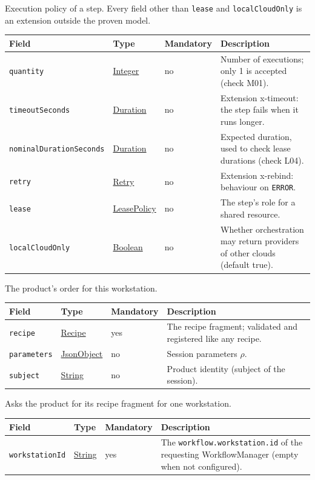 \documentclass[a4paper]{arrowhead}
\newcommand{\mref}[1]{{\textcolor{ArrowheadPurple}{\hyperref[sec:model:#1]{#1}}}}
\newcommand{\pref}[1]{{\textcolor{ArrowheadGrey}{\hyperref[sec:model:primitives:#1]{#1}}}}
\begin{document}
Execution policy of a step. Every field other than \texttt{lease} and \texttt{localCloudOnly} is an extension outside the proven model.

{\small
\begin{longtable}{|p{3.7cm}|p{4.2cm}|p{1.6cm}|p{6.3cm}|}

\hline
\rowcolor{gray!33} Field & Type & Mandatory & Description \\ \hline
\endhead
\texttt{quantity} & \pref{Integer} & no & Number of executions; only 1 is accepted (check M01). \\ \hline
\texttt{timeoutSeconds} & \pref{Duration} & no & Extension x-timeout: the step fails when it runs longer. \\ \hline
\texttt{nominalDurationSeconds} & \pref{Duration} & no & Expected duration, used to check lease durations (check L04). \\ \hline
\texttt{retry} & \mref{Retry} & no & Extension x-rebind: behaviour on \texttt{ERROR}. \\ \hline
\texttt{lease} & \mref{LeasePolicy} & no & The step's role for a shared resource. \\ \hline
\texttt{localCloudOnly} & \pref{Boolean} & no & Whether orchestration may return providers of other clouds (default true). \\ \hline
\end{longtable}
}

The product's order for this workstation.

{\small
\begin{longtable}{|p{3.7cm}|p{4.2cm}|p{1.6cm}|p{6.3cm}|}

\hline
\rowcolor{gray!33} Field & Type & Mandatory & Description \\ \hline
\endhead
\texttt{recipe} & \mref{Recipe} & yes & The recipe fragment; validated and registered like any recipe. \\ \hline
\texttt{parameters} & \pref{JsonObject} & no & Session parameters $\rho$. \\ \hline
\texttt{subject} & \pref{String} & no & Product identity (subject of the session). \\ \hline
\end{longtable}
}

Asks the product for its recipe fragment for one workstation.

{\small
\begin{longtable}{|p{3.7cm}|p{4.2cm}|p{1.6cm}|p{6.3cm}|}

\hline
\rowcolor{gray!33} Field & Type & Mandatory & Description \\ \hline
\endhead
\texttt{workstationId} & \pref{String} & yes & The \texttt{workflow.workstation.id} of the requesting WorkflowManager (empty when not configured). \\ \hline
\end{longtable}
}
\end{document}
